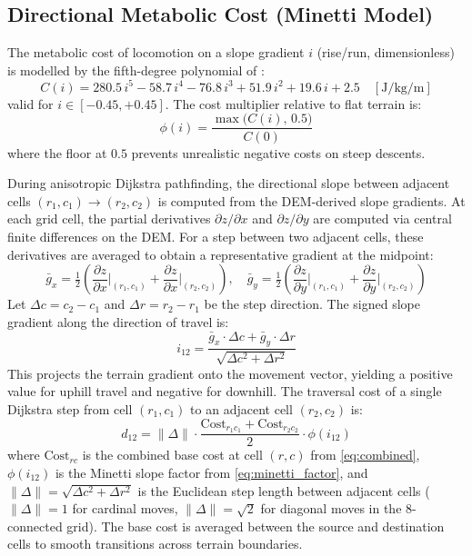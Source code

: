 \documentclass[preprint,11pt]{elsarticle}
\begin{document}
\subsection{Directional Metabolic Cost (Minetti Model)}
\label{sec:minetti}

The metabolic cost of locomotion on a slope gradient $i$ (rise/run, dimensionless) is modelled by the fifth-degree polynomial of \citet{minetti2002}:
\begin{equation}
  C(i) = 280.5\,i^5 - 58.7\,i^4 - 76.8\,i^3 + 51.9\,i^2 + 19.6\,i + 2.5 \quad [\text{J/kg/m}]
  \label{eq:minetti}
\end{equation}
valid for $i \in [-0.45, +0.45]$.
The cost multiplier relative to flat terrain is:
\begin{equation}
  \phi(i) = \frac{\max\bigl(C(i),\, 0.5\bigr)}{C(0)}
  \label{eq:minetti_factor}
\end{equation}
where the floor at $0.5$ prevents unrealistic negative costs on steep descents.

During anisotropic Dijkstra pathfinding, the directional slope between adjacent cells $(r_1, c_1) \to (r_2, c_2)$ is computed from the DEM-derived slope gradients.
At each grid cell, the partial derivatives $\partial z / \partial x$ and $\partial z / \partial y$ are computed via central finite differences on the DEM.
For a step between two adjacent cells, these derivatives are averaged to obtain a representative gradient at the midpoint:
\begin{equation}
  \bar{g}_x = \tfrac{1}{2}\!\left(\frac{\partial z}{\partial x}\bigg|_{(r_1,c_1)} + \frac{\partial z}{\partial x}\bigg|_{(r_2,c_2)}\right), \quad
  \bar{g}_y = \tfrac{1}{2}\!\left(\frac{\partial z}{\partial y}\bigg|_{(r_1,c_1)} + \frac{\partial z}{\partial y}\bigg|_{(r_2,c_2)}\right)
  \label{eq:gradavg}
\end{equation}
Let $\Delta c = c_2 - c_1$ and $\Delta r = r_2 - r_1$ be the step direction.
The signed slope gradient along the direction of travel is:
\begin{equation}
  i_{12} = \frac{\bar{g}_x \cdot \Delta c + \bar{g}_y \cdot \Delta r}{\sqrt{\Delta c^2 + \Delta r^2}}
  \label{eq:dirslope}
\end{equation}
This projects the terrain gradient onto the movement vector, yielding a positive value for uphill travel and negative for downhill.
The traversal cost of a single Dijkstra step from cell $(r_1, c_1)$ to an adjacent cell $(r_2, c_2)$ is:
\begin{equation}
  d_{12} = \|\Delta\| \cdot \frac{\text{Cost}_{r_1 c_1} + \text{Cost}_{r_2 c_2}}{2} \cdot \phi(i_{12})
  \label{eq:edgecost}
\end{equation}
where $\text{Cost}_{rc}$ is the combined base cost at cell $(r,c)$ from \cref{eq:combined}, $\phi(i_{12})$ is the Minetti slope factor from \cref{eq:minetti_factor}, and $\|\Delta\| = \sqrt{\Delta c^2 + \Delta r^2}$ is the Euclidean step length between adjacent cells ($\|\Delta\| = 1$ for cardinal moves, $\|\Delta\| = \sqrt{2}$ for diagonal moves in the 8-connected grid).
The base cost is averaged between the source and destination cells to smooth transitions across terrain boundaries.
\end{document}
